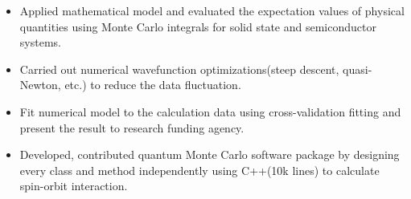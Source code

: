 \documentclass[11pt]{article} %
\begin{document}
\begin{itemize}
  \item Applied mathematical model and evaluated the expectation values of physical quantities using Monte Carlo integrals for solid state and semiconductor systems. \\
\vspace{-4mm}
  \item Carried out numerical wavefunction optimizations(steep descent, quasi-Newton, etc.) to reduce the data fluctuation. \\
  \vspace{-4mm}
  \item Fit numerical model to the calculation data using cross-validation fitting and present the result to research funding agency.
  \item Developed, contributed quantum Monte Carlo software package by designing every class and method independently using C++(10k lines) to calculate spin-orbit interaction.\\

\end{itemize}
\end{document}
